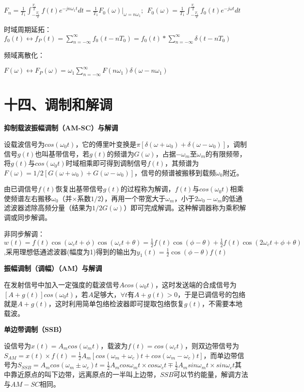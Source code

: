 $F_n=\frac 1{T_1}\int_{-\frac {T_1}2}^{\frac {T_1}2}f(t)e^{-jn\omega_1 t}dt=\frac 1{T_1}F_0(\omega)|_{\omega=n\omega_1};\ \  F_0(\omega)=\frac 1{T_1}\int_{-\frac {T_1}2}^{\frac {T_1}2}f_0(t)e^{-j\omega t}dt$

时域周期延拓：$f_0(t) \leftrightarrow f_P(t)=\sum_{n=-\infty}^{\infty} f_0\left(t-n T_0\right)=f_0(t)*\sum_{n=-\infty}^{\infty} \delta\left(t-n T_0\right)$

频域离散化：

$F(\omega) \leftrightarrow F_P(\omega) = \omega_1\sum_{n=-\infty}^{\infty}F(n\omega_1)\delta(\omega-n\omega_1)$

\section*{十四、调制和解调}

\textbf{抑制载波振幅调制（AM-SC）与解调}

设载波信号为$cos(\omega_0 t)$，它的傅里叶变换是$\pi [\delta(\omega + \omega_0) + \delta(\omega - \omega_0)]$，调制信号$g(t)$也叫基带信号，若$g(t)$的频谱为$G(\omega)$，占据$-\omega_m$至$\omega_m$的有限频带，将$g(t)$与$cos(\omega_0 t)$时域相乘即可得到调制信号$f(t)$，其频谱为$F(\omega)=1/2 [G(\omega + \omega_0) + G(\omega - \omega_0)]$，信号的频谱被搬移到载频$\omega_0$附近。

由已调信号$f(t)$恢复出基带信号$g(t)$的过程称为解调，$f(t)$与$cos(\omega_0 t)$相乘使频谱左右搬移$\omega_0$（并$\times 系数1/2$），再用一个带宽大于$\omega_m$，小于$2\omega_0 - \omega_m$的低通滤波器滤除高频分量（结果为$1/2G(\omega)$）即可完成解调。这种解调器称为乘积解调或同步解调。

非同步解调：$w(t)=f(t)\cos(\omega_c t+\phi)\cos(\omega_c t+\theta)=\frac{1}{2}f(t)\cos(\phi-\theta)+\frac{1}{2}f(t)\cos(2\omega_c t+\phi+\theta)$,采用理想低通滤波器(幅度为1)得到的输出为$y_1(t)=\frac{1}{2}\cos(\phi-\theta) f(t)$

\textbf{振幅调制（调幅）（AM）与解调}

在发射信号中加入一定强度的载波信号$Acos(\omega_0 t)$，这时发送端的合成信号为$[A+g(t)]cos(\omega_0 t)$，若$A$足够大，$\forall t$有$A+g(t)>0$，于是已调信号的包络就是$A+g(t)$，这时利用简单包络检波器即可提取包络恢复$g(t)$，不需要本地载波。

\textbf{单边带调制（SSB）}

设信号为$x(t)=A_m cos(\omega_m t)$，载波为$f(t)=cos(\omega_c t)$，则双边带信号为$S_{AM}=x(t)\times f(t)=\frac{1}{2} A_m[cos(\omega_m + \omega_c)t + cos(\omega_m - \omega_c)t]$，而单边带信号为$S_{SSB}=A_mcos(\omega_m \pm \omega_c)t=\frac{1}{2} A_mcos\omega_m t \times cos\omega_c t \mp \frac{1}{2} A_m sin \omega_m t \times sin\omega_c t$其中靠近原点的叫下边带，远离原点的一半叫上边带，$SSB$可以节约能量，解调方法与$AM-SC$相同。

